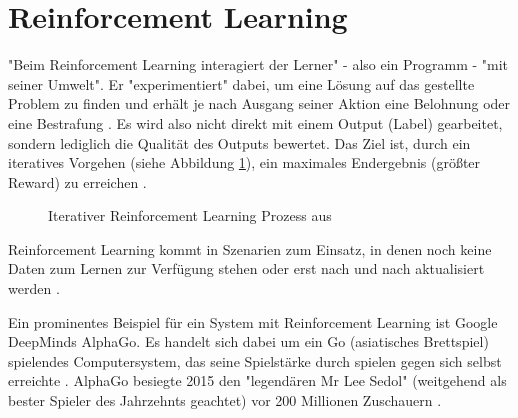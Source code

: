 \section{Reinforcement Learning}\label{sec:rl1}
"Beim Reinforcement Learning interagiert der Lerner" - also ein Programm - "mit seiner Umwelt"\citep[S.~45; eigene Übersetzung]{settles_active_2010}. Er "experimentiert" dabei, um eine Lösung auf das gestellte Problem zu finden und erhält je nach Ausgang seiner Aktion eine Belohnung oder eine Bestrafung \citep[S.~331]{kubat_introduction_2017}. Es wird also nicht direkt mit einem Output (Label) gearbeitet, sondern lediglich die Qualität des Outputs bewertet. Das Ziel ist, durch ein iteratives Vorgehen (siehe Abbildung \ref{fig:reinforcementLearning}), ein maximales Endergebnis (größter Reward) zu erreichen \citep[S.~69]{swamynathan_mastering_2017}.
\begin{figure}[H]
\centering
{}
\caption{Iterativer Reinforcement Learning Prozess aus \citep[S.~25]{lison_introduction_2012}}
\label{fig:reinforcementLearning}
\end{figure}
Reinforcement Learning kommt in Szenarien zum Einsatz, in denen noch keine Daten zum Lernen zur Verfügung stehen oder erst nach und nach aktualisiert werden \citep[S.~223]{ramasubramanian_machine_2017}.\par
Ein prominentes Beispiel für ein System mit Reinforcement Learning ist Google DeepMinds AlphaGo. Es handelt sich dabei um ein Go (asiatisches Brettspiel) spielendes Computersystem, das seine Spielstärke durch spielen gegen sich selbst erreichte \citep{silver_mastering_2017}. AlphaGo besiegte 2015 den "legendären Mr Lee Sedol" (weitgehend als bester Spieler des Jahrzehnts geachtet) vor 200 Millionen Zuschauern \citep{deepmind_alphago_2017}.

